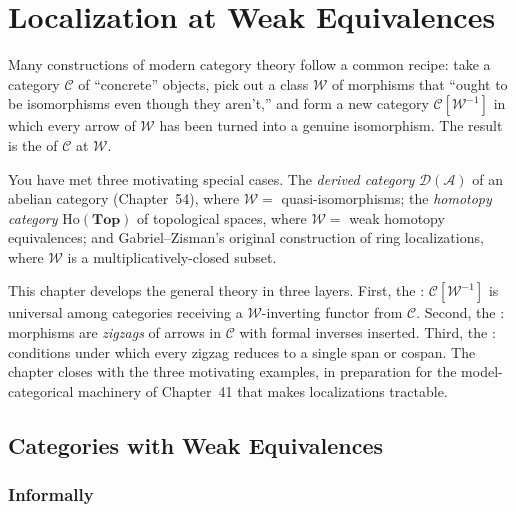 
\chapter{Localization at Weak Equivalences}

\begin{overviewbox}
Many constructions of modern category theory follow a common recipe: take
a category $\mathcal{C}$ of ``concrete'' objects, pick out a class
$\mathcal{W}$ of morphisms that ``ought to be isomorphisms even though
they aren't,'' and form a new category $\mathcal{C}[\mathcal{W}^{-1}]$
in which every arrow of $\mathcal{W}$ has been turned into a genuine
isomorphism. The result is the  of $\mathcal{C}$
at $\mathcal{W}$.

You have met three motivating special cases. The \emph{derived category}
$\mathcal{D}(\mathcal{A})$ of an abelian category (Chapter~54), where
$\mathcal{W} = $ quasi-isomorphisms; the \emph{homotopy category}
$\mathrm{Ho}(\mathbf{Top})$ of topological spaces, where $\mathcal{W} = $
weak homotopy equivalences; and Gabriel--Zisman's original construction
of ring localizations, where $\mathcal{W}$ is a multiplicatively-closed
subset.

This chapter develops the general theory in three layers. First, the
: $\mathcal{C}[\mathcal{W}^{-1}]$ is universal
among categories receiving a $\mathcal{W}$-inverting functor from
$\mathcal{C}$. Second, the : morphisms
are \emph{zigzags} of arrows in $\mathcal{C}$ with formal inverses
inserted. Third, the : conditions under
which every zigzag reduces to a single span or cospan. The chapter
closes with the three motivating examples, in preparation for the
model-categorical machinery of Chapter~41 that makes localizations
tractable.
\end{overviewbox}


\section{Categories with Weak Equivalences}
\label{sec:weak-equivalences}

\subsection{Informally}

